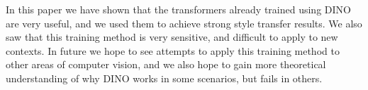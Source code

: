 \documentclass{article}
\begin{document}
In this paper we have shown that the transformers already trained using DINO are very useful, and we used them to achieve strong style transfer results. We also saw that this training method is very sensitive, and difficult to apply to new contexts. In future we hope to see attempts to apply this training method to other areas of computer vision, and we also hope to gain more theoretical understanding of why DINO works in some scenarios, but fails in others. 

\let\thefootnote\relax{}

\nocite{*}


\end{document}
